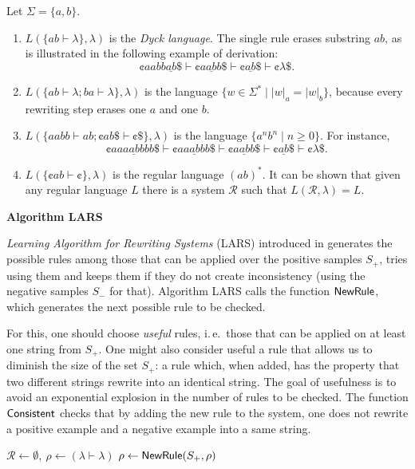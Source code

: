 \begin{example}
Let $\Sigma = \{a, b\}$. 
\begin{enumerate}
\item $L(\{ab \vdash \lambda\}, \lambda)$ is the \emph{Dyck language}. The single rule erases substring $ab$, as is illustrated in the following example of derivation:
$$\cent aabb \underline{ab} \$ \vdash
\cent a \underline{ab} b \$ \vdash
\cent \underline{ab} \$ \vdash
\cent \lambda \$.$$
\item $L(\{ab \vdash \lambda; ba \vdash \lambda\}, \lambda)$ is the language $\{w \in \Sigma^* \mid |w|_a = |w|_b\}$, because every rewriting step erases one $a$ and one $b$.
\item $L(\{aabb \vdash ab; \cent ab \$ \vdash \cent \$\}, \lambda)$ is the language $\{a^n b^n \mid n \ge 0\}$. For instance, 
$$\cent aa \underline{aabb} bb \$ \vdash
\cent a \underline{aabb} b \$ \vdash
\cent \underline{aabb} \$ \vdash
\cent \underline{ab} \$ \vdash
\cent \lambda \$.$$
\item $L(\{\cent ab \vdash \cent \}, \lambda)$ is the regular language $(ab)^*$. It can be shown that given any regular language $L$ there is a system $\mathcal{R}$ such that $L(\mathcal{R}, \lambda) = L$.
\end{enumerate}
\end{example}

{\bf Algorithm LARS}\label{section:lars}

\emph{Learning Algorithm for Rewriting Systems} (LARS) introduced in \cite{Eyraud2007} generates the possible rules among those that can be applied over the positive samples $S_+$, tries using them and keeps them if they do not create inconsistency (using the negative samples $S_-$ for that). Algorithm LARS calls the function \index{$\NewRule$}$\NewRule$, which generates the next possible rule to be checked.

For this, one should choose \emph{useful} rules, i.\,e.\ those that can be applied on at least one string from $S_+$. One might also consider useful a rule that allows us to diminish the size of the set $S_+$: a rule which, when added, has the property that two different strings rewrite into an identical string. The goal of usefulness is to avoid an exponential explosion in the number of rules to be checked. The function \index{$\Consistent$}$\Consistent$ checks that by adding the new rule to the system, one does not rewrite a positive example and a negative example into a same string.

\begin{algorithm}
\caption{Learning algorithm $\mathsf{LARS}(S_+, S_-)$}
\label{algorithm:lars}
\LinesNumbered
{}
$\mathcal{R} \gets \emptyset,\ \rho \gets (\lambda \vdash \lambda)$\;
{$\rho \gets \textup{\sf NewRule}(S_+, \rho)$\;
}
\;
\end{algorithm}

